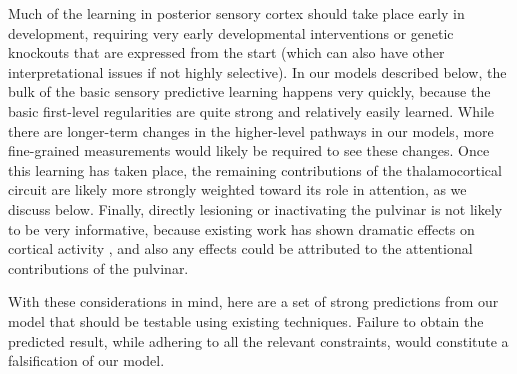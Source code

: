\documentclass[11pt,twoside]{article}
\newif\myifpdf
\begin{document}
Much of the learning in posterior sensory cortex should take place early in development, requiring very early developmental interventions or genetic knockouts that are expressed from the start (which can also have other interpretational issues if not highly selective).  In our models described below, the bulk of the basic sensory predictive learning happens very quickly, because the basic first-level regularities are quite strong and relatively easily learned.  While there are longer-term changes in the higher-level pathways in our models, more fine-grained measurements would likely be required to see these changes.  Once this learning has taken place, the remaining contributions of the thalamocortical circuit are likely more strongly weighted toward its role in attention, as we discuss below.  Finally, directly lesioning or inactivating the pulvinar is not likely to be very informative, because existing work has shown dramatic effects on cortical activity \citep{ZhouSchaferDesimone16,PurushothamanMarionLiEtAl12}, and also any effects could be attributed to the attentional contributions of the pulvinar.

With these considerations in mind, here are a set of strong predictions from our model that should be testable using existing techniques.  Failure to obtain the predicted result, while adhering to all the relevant constraints, would constitute a falsification of our model.
\end{document}
